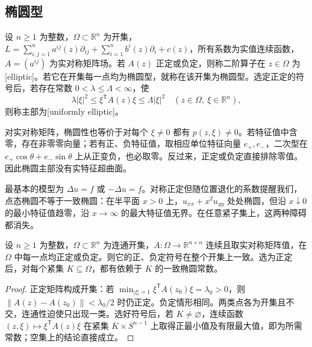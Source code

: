 \subsection{椭圆型}
\label{b2:subsec:080201}

\begin{definition}\label{b2:def:08-elliptic}
设 \(n\geq1\) 为整数，\(\Omega\subset\mathbb R^n\) 为开集，\(L=\sum_{i,j=1}^n a^{ij}(z)\partial_{ij}+\sum_{i=1}^n b^i(z)\partial_i+c(z)\)，所有系数为实值连续函数，\(A=(a^{ij})\) 为实对称矩阵场。若 \(A(z)\) 正定或负定，则称二阶算子在 \(z\in\Omega\) 为[elliptic]。若它在开集每一点均为椭圆型，就称在该开集为椭圆型。选定正定的符号后，若存在常数 \(0<\lambda\leq\Lambda<\infty\)，使
\[
 \lambda|\xi|^2\leq\xi^{\mathsf T}A(z)\xi\leq\Lambda|\xi|^2
 \quad(z\in\Omega,\ \xi\in\mathbb R^n),
\]
则称主部为[uniformly elliptic]。
\end{definition}

对实对称矩阵，椭圆性也等价于对每个 \(\xi\ne0\) 都有 \(p(z,\xi)\ne0\)。若特征值中含零，存在非零零向量；若有正、负特征值，取相应单位特征向量 \(e_+,e_-\)，二次型在 \(e_+\cos\theta+e_-\sin\theta\) 上从正变负，也必取零。反过来，正定或负定直接排除零值。因此椭圆主部没有实特征超曲面。

\ProseParagraphBreak

最基本的模型为 \(\Delta u=f\) 或 \(-\Delta u=f\)。对称正定但随位置退化的系数提醒我们，点态椭圆不等于一致椭圆：在半平面 \(x>0\) 上，\(u_{xx}+x^2u_{yy}\) 处处椭圆，但沿 \(x\downarrow0\) 的最小特征值趋零，沿 \(x\to\infty\) 的最大特征值无界。在任意紧子集上，这两种障碍都消失。

\begin{proposition}\label{b2:prop:08-compact-ellipticity}
设 \(n\geq1\) 为整数，\(\Omega\subset\mathbb R^n\) 为连通开集，\(A:\Omega\to\mathbb R^{n\times n}\) 连续且取实对称矩阵值，在 \(\Omega\) 中每一点均正定或负定。则它的正、负定符号在整个开集上一致。选为正定后，对每个紧集 \(K\subseteq\Omega\)，都有依赖于 \(K\) 的一致椭圆常数。
\end{proposition}
\begin{proof}
正定矩阵构成开集：若 \(\min_{|\xi|=1}\xi^{\mathsf T}A(z_0)\xi=\lambda_0>0\)，则 \(\|A(z)-A(z_0)\|<\lambda_0/2\) 时仍正定。负定情形相同。两类点各为开集且不交，连通性迫使只出现一类。选好符号后，若 \(K\ne\varnothing\)，连续函数 \((z,\xi)\mapsto\xi^{\mathsf T}A(z)\xi\) 在紧集 \(K\times S^{n-1}\) 上取得正最小值及有限最大值，即为所需常数；空集上的结论直接成立。
\end{proof}


